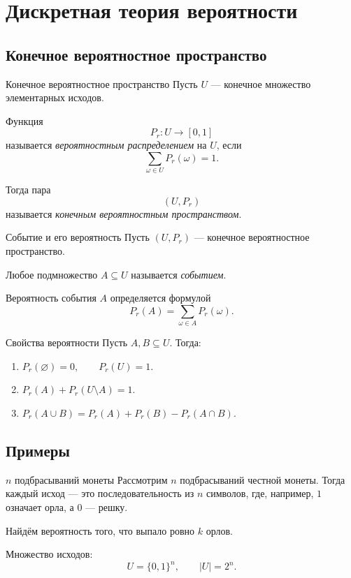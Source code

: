 
\section{Дискретная теория вероятности}

\subsection{Конечное вероятностное пространство}

\begin{Definition}{Конечное вероятностное пространство}{}
	Пусть \(U\) --- конечное множество элементарных исходов.
	
	Функция
	\[
	P_r \colon U \to [0,1]
	\]
	называется \textit{вероятностным распределением} на \(U\), если
	\[
	\sum_{\omega \in U} P_r(\omega)=1.
	\]
	
	Тогда пара
	\[
	(U, P_r)
	\]
	называется \textit{конечным вероятностным пространством}.
\end{Definition}

\begin{Definition}{Событие и его вероятность}{}
	Пусть \((U, P_r)\) --- конечное вероятностное пространство.
	
	Любое подмножество \(A \subseteq U\) называется \textit{событием}.
	
	Вероятность события \(A\) определяется формулой
	\[
	P_r(A)=\sum_{\omega\in A} P_r(\omega).
	\]
\end{Definition}

\begin{Statement}{Свойства вероятности}{}
	Пусть \(A,B \subseteq U\). Тогда:
	\begin{enumerate}[label=\arabic*.]
		\item \(P_r(\varnothing)=0,\qquad P_r(U)=1.\)
		\item \(P_r(A)+P_r(U\setminus A)=1.\)
		\item \(P_r(A\cup B)=P_r(A)+P_r(B)-P_r(A\cap B).\)
	\end{enumerate}
\end{Statement}
	\subsection{Примеры}
	
	\begin{Example}{$n$ подбрасываний монеты}{}
		Рассмотрим \(n\) подбрасываний честной монеты. Тогда каждый исход --- это последовательность из \(n\) символов, где, например, \(1\) означает орла, а \(0\) --- решку.
		
		Найдём вероятность того, что выпало ровно \(k\) орлов.
		\end{Example}
		Множество исходов:
		\[
		U=\{0,1\}^n,
		\qquad |U|=2^n.
		\]
		
